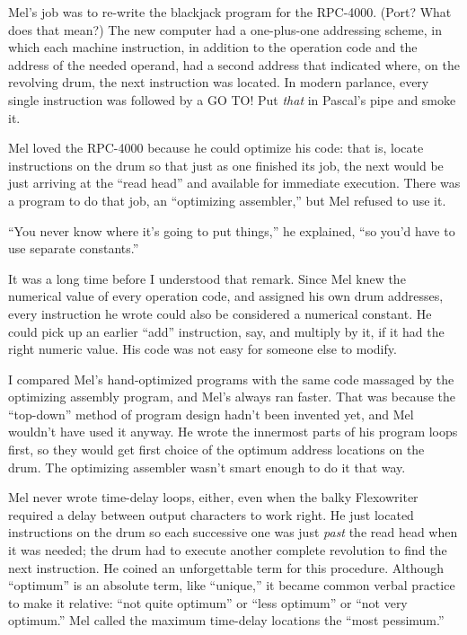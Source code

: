 \documentclass[12pt]{article}
\begin{document}
\bigskip
Mel's job was to re-write the blackjack program for the
RPC-4000. (Port? What does that mean?) The new computer
had a one-plus-one addressing scheme, in which each machine
instruction, in addition to the operation code and the
address of the needed operand, had a second address that
indicated where, on the revolving drum, the next instruction
was located. In modern parlance, every single instruction
was followed by a GO TO! Put {\it that} in Pascal's pipe and
smoke it.

\bigskip
Mel loved the RPC-4000 because he could optimize his code:
that is, locate instructions on the drum so that just as one
finished its job, the next would be just arriving at the
``read head'' and available for immediate execution. There
was a program to do that job, an ``optimizing assembler,'' but
Mel refused to use it.

\bigskip
``You never know where it's going to put things,'' he
explained, ``so you'd have to use separate constants.''

\bigskip
It was a long time before I understood that remark. Since
Mel knew the numerical value of every operation code, and
assigned his own drum addresses, every instruction he wrote
could also be considered a numerical constant. He could
pick up an earlier ``add'' instruction, say, and multiply by
it, if it had the right numeric value. His code was not
easy for someone else to modify.

\bigskip
I compared Mel's hand-optimized programs with the same code
massaged by the optimizing assembly program, and Mel's
always ran faster. That was because the ``top-down'' method
of program design hadn't been invented yet, and Mel wouldn't
have used it anyway. He wrote the innermost parts of his
program loops first, so they would get first choice of the
optimum address locations on the drum. The optimizing
assembler wasn't smart enough to do it that way.

\bigskip
Mel never wrote time-delay loops, either, even when the
balky Flexowriter required a delay between output characters
to work right. He just located instructions on the drum so
each successive one was just {\it past} the read head when it
was needed; the drum had to execute another complete
revolution to find the next instruction. He coined an
unforgettable term for this procedure. Although ``optimum''
is an absolute term, like ``unique,'' it became common verbal
practice to make it relative: ``not quite optimum'' or ``less
optimum'' or ``not very optimum.'' Mel called the maximum
time-delay locations the ``most pessimum.''
\end{document}
